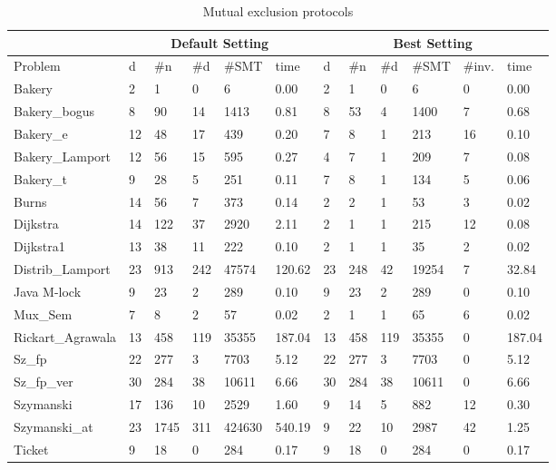 \documentclass{LMCS}
\theoremstyle{plain}\newtheorem{assumption}[thm]{Assumption}
\theoremstyle{plain}\newtheorem{proposition}[thm]{Proposition}
\theoremstyle{plain}\newtheorem{property}[thm]{Property}
\theoremstyle{plain}\newtheorem{example}[thm]{Example}
\theoremstyle{plain}\newtheorem{claim}[thm]{Claim}
\theoremstyle{plain}\newtheorem{lemma}[thm]{Lemma}
\begin{document}
\begin{table}[t]
\small
\caption{\label{subapp:mep}Mutual exclusion protocols}
\begin{tabular}{||l|l|l|l|l|l||l|l|l|l|l|l||}
\hline\hline
& \multicolumn{5}{|c||}{Default Setting} & 
  \multicolumn{6}{|c||}{Best Setting} \\ \hline
Problem  & d & \#n & \#d & \#SMT & time 
         & d & \#n & \#d & \#SMT & \#inv. & time \\ \hline\hline
Bakery & 	2 & 	1 & 	0 & 	6 & 	0.00
       & 	2 & 	1 & 	0 & 	6 & 	0 & 	0.00 \\ \hline
Bakery\_bogus & 	8 & 	90 & 	14 & 	1413 & 	0.81
              & 	8 & 	53 & 	4 & 	1400 & 	7 & 	0.68 \\ \hline
Bakery\_e & 	12 & 	48 & 	17 & 	439 & 	0.20 
          & 	7 & 	8 & 	1 & 	213 & 	16 & 	0.10 \\ \hline
Bakery\_Lamport & 	12 & 	56 & 	15 & 	595 & 	0.27 
                & 	4 & 	7 & 	1 & 	209 & 	7 & 	0.08 \\ \hline
Bakery\_t & 	9 & 	28 & 	5 & 	251 & 	0.11 
          & 	7 & 	8 & 	1 & 	134 & 	5 & 	0.06 \\ \hline
Burns & 	14 & 	56 & 	7 & 	373 & 	0.14 
      & 	2 & 	2 & 	1 & 	53 & 	3 & 	0.02 \\ \hline
Dijkstra & 	14 & 	122 & 	37 & 	2920 & 	2.11 
         & 	2 & 	1 & 	1 & 	215 & 	12 & 	0.08 \\ \hline
Dijkstra1 & 	13 & 	38 & 	11 & 	222 & 	0.10 
          & 	2 & 	1 & 	1 & 	35 & 	2 & 	0.02 \\ \hline
Distrib\_Lamport & 	23 & 	913 & 	242 & 	47574 & 	120.62 
                 & 	23 & 	248 & 	42 & 	19254 & 	7 & 	32.84 \\ \hline
Java  M-lock & 	9 & 	23 & 	2 & 	289 & 	0.10 
             & 	9 & 	23 & 	2 & 	289 & 	0 & 	0.10 \\ \hline
Mux\_Sem & 	7 & 	8 & 	2 & 	57 & 	0.02
         & 	2 & 	1 & 	1 & 	65 & 	6 & 	0.02 \\ \hline
Rickart\_Agrawala & 	13 & 	458 & 	119 & 	35355 & 	187.04 
                  & 	13 & 	458 & 	119 & 	35355 & 	0 & 	187.04 \\ \hline
Sz\_fp & 	22 & 	277 & 	3 & 	7703 & 	5.12 
       & 	22 & 	277 & 	3 & 	7703 & 	0 & 	5.12 \\ \hline
Sz\_fp\_ver & 	30 & 	284 & 	38 & 	10611 & 	6.66 
            & 	30 & 	284 & 	38 & 	10611 & 	0 & 	6.66 \\ \hline
Szymanski & 	17 & 	136 & 	10 & 	2529 & 	1.60 
          & 	9 & 	14 & 	5 & 	882 & 	12 & 	0.30 \\ \hline
Szymanski\_at & 	23 & 	1745 & 	311 & 	424630 & 	540.19 
              & 	9 & 	22 & 	10 & 	2987 & 	42 & 	1.25 \\ \hline
Ticket & 	9 & 	18 & 	0 & 	284 & 	0.17 
       & 	9 & 	18 & 	0 & 	284 & 	0 & 	0.17 \\ \hline\hline
\end{tabular}
\end{table}
\end{document}
